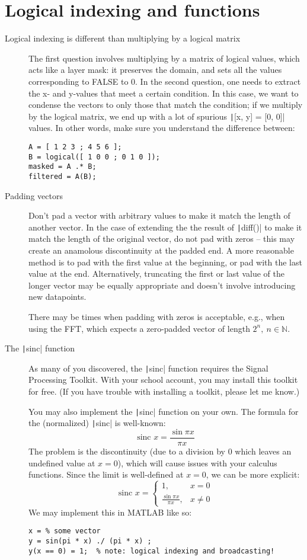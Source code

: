\documentclass{article}
\begin{document}
\clearpage{}
\section{Logical indexing and functions}
\begin{description}
\item[Logical indexing is different than multiplying by a logical matrix] The first question involves multiplying by a matrix of logical values, which acts like a layer mask: it preserves the domain, and sets all the values corresponding to FALSE to 0. In the second question, one needs to extract the x- and y-values that meet a certain condition. In this case, we want to condense the vectors to only those that match the condition; if we multiply by the logical matrix, we end up with a lot of spurious \texttt|[x, y] = [0, 0]| values. In other words, make sure you understand the difference between:
\begin{verbatim}
A = [ 1 2 3 ; 4 5 6 ];
B = logical([ 1 0 0 ; 0 1 0 ]);
masked = A .* B;
filtered = A(B);
\end{verbatim}

\item[Padding vectors] Don't pad a vector with arbitrary values to make it match the length of another vector. In the case of extending the the result of \texttt|diff()| to make it match the length of the original vector, do not pad with zeros -- this may create an anamolous discontinuity at the padded end. A more reasonable method is to pad with the first value at the beginning, or pad with the last value at the end. Alternatively, truncating the first or last value of the longer vector may be equally appropriate and doesn't involve introducing new datapoints.

  There may be times when padding with zeros is acceptable, e.g., when using the FFT, which expects a zero-padded vector of length $2^n,\ n\in\mathbb{N}$.

\item[The \texttt|sinc| function] As many of you discovered, the \texttt|sinc| function requires the Signal Processing Toolkit. With your school account, you may install this toolkit for free. (If you have trouble with installing a toolkit, please let me know.)

  You may also implement the \texttt|sinc| function on your own. The formula for the (normalized) \texttt|sinc| is well-known: \[\text{sinc }x = \frac{\sin\pi x}{\pi x}\] The problem is the discontinuity (due to a division by 0 which leaves an undefined value at $x=0$), which will cause issues with your calculus functions. Since the limit is well-defined at $x=0$, we can be more explicit: \[\text{sinc }x=
    \begin{cases}
      1, & x=0 \\
      \frac{\sin\pi x}{\pi x}, & x\ne 0
    \end{cases}
  \] We may implement this in MATLAB like so:
\begin{verbatim}
x = % some vector
y = sin(pi * x) ./ (pi * x) ;
y(x == 0) = 1;  % note: logical indexing and broadcasting!
\end{verbatim}
\end{description}
\end{document}
